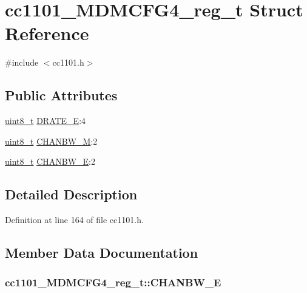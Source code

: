 \hypertarget{structcc1101___m_d_m_c_f_g4__reg__t}{}\section{cc1101\+\_\+\+M\+D\+M\+C\+F\+G4\+\_\+reg\+\_\+t Struct Reference}
\label{structcc1101___m_d_m_c_f_g4__reg__t}


{\ttfamily \#include $<$cc1101.\+h$>$}

\subsection*{Public Attributes}
\begin{DoxyCompactItemize}
\item 
\hyperlink{_p_e___types_8h_aba7bc1797add20fe3efdf37ced1182c5}{uint8\+\_\+t} \hyperlink{structcc1101___m_d_m_c_f_g4__reg__t_acb6eb867bce3fcecb9a11f6900de55cb}{D\+R\+A\+T\+E\+\_\+E}\+:4
\item 
\hyperlink{_p_e___types_8h_aba7bc1797add20fe3efdf37ced1182c5}{uint8\+\_\+t} \hyperlink{structcc1101___m_d_m_c_f_g4__reg__t_a2c4b53c73a287d6e31f828c18d25f858}{C\+H\+A\+N\+B\+W\+\_\+M}\+:2
\item 
\hyperlink{_p_e___types_8h_aba7bc1797add20fe3efdf37ced1182c5}{uint8\+\_\+t} \hyperlink{structcc1101___m_d_m_c_f_g4__reg__t_a267a4d0cb6da5e9d99218422b8dfa8c4}{C\+H\+A\+N\+B\+W\+\_\+E}\+:2
\end{DoxyCompactItemize}


\subsection{Detailed Description}


Definition at line 164 of file cc1101.\+h.



\subsection{Member Data Documentation}
\subsubsection[{\texorpdfstring{C\+H\+A\+N\+B\+W\+\_\+E}{CHANBW_E}}]{ cc1101\+\_\+\+M\+D\+M\+C\+F\+G4\+\_\+reg\+\_\+t\+::\+C\+H\+A\+N\+B\+W\+\_\+E}\hypertarget{structcc1101___m_d_m_c_f_g4__reg__t_a267a4d0cb6da5e9d99218422b8dfa8c4}{}\label{structcc1101___m_d_m_c_f_g4__reg__t_a267a4d0cb6da5e9d99218422b8dfa8c4}


